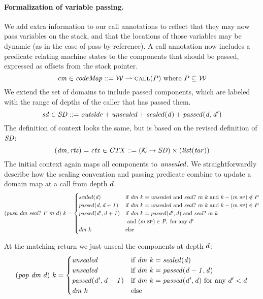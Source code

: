 \documentclass[acmsmall,review,anonymous]{acmart}\settopmatter{printfolios=true,printccs=false,printacmref=false}
\begin{document}
{{\paragraph{Formalization of variable passing.}
We add extra information to our call
annotations to reflect that they may now pass variables on the stack, and that the locations
of those variables may be dynamic (as in the case of pass-by-reference).
A call annotation now includes a predicate relating machine states to the components
that should be passed, expressed as offsets from the stack pointer.
\[\mathit{cm} \in \mathit{codeMap} ::= {\mathcal W} \rightharpoonup \text{\sc call}(P)~\mbox{\rm where}~P \subseteq {\mathcal W}\]
We extend the set of domains to include passed components,
which are labeled with the range of depths of the caller that has passed them.
\[\mathit{sd} \in \mathit{SD} ::= \mathit{outside} + \mathit{unsealed} + \mathit{sealed(d)} + \mathit{passed(d,d')}\]
The definition of context looks the same, but is based on the revised definition of \(\mathit{SD}\):
\[(\mathit{dm},\mathit{rts}) = \mathit{ctx} \in \mathit{CTX} ::= ({\mathcal K} \rightarrow \mathit{SD})
\times (\mathit{list} (\mathit{tar})) \]
The initial context again maps all components to \(\mathit{unsealed}\).
We straightforwardly describe how the sealing convention and passing predicate combine to
update a domain map at a call from depth \(d\).
\[(\mathit{push} ~ \mathit{dm} ~ \mathit{seal?} ~ P ~ m ~ d) ~ k =
\begin{cases}
  \mathit{sealed(d)}              & \text{if } \mathit{dm} ~ k = \mathit{unsealed} \text{ and }
                                 \mathit{seal?} ~ m ~ k \text{ and }
                                 k - (m ~ \textsc{sp}) \not \in P \\
  \mathit{passed(d,d+1)}     & \text{if } \mathit{dm} ~ k = \mathit{unsealed} \text{ and }
                                 \mathit{seal?} ~ m ~ k \text{ and }
                                 k - (m ~ \textsc{sp}) \in P \\
  \mathit{passed(d',d+1)}    & \text{if } \mathit{dm} ~ k = \mathit{passed(d',d)} \text{ and }
                                 \mathit{seal?} ~ m ~ k \\
                               & \text{ and } (m ~ \textsc{sp}) \in P, \text{ for any } d' \\
  \mathit{dm}~k & \text{else} \\
\end{cases}\]

At the matching return we just unseal the components at depth \(d\):
%
\[(\mathit{pop} ~ \mathit{dm} ~ d) ~ k =
\begin{cases}
  \mathit{unsealed}                 & \text{if } \mathit{dm} ~ k = \mathit{sealed(d)} \\
  \mathit{unsealed}                 & \text{if } \mathit{dm} ~ k = \mathit{passed(d-1,d)} \\
  \mathit{passed(d',d-1)} & \text{if } \mathit{dm} ~ k = \mathit{passed(d',d)}
                              \text{ for any } d' < d \\
  \mathit{dm}~k        & \text{else} \\
\end{cases}\]

}}
\end{document}
